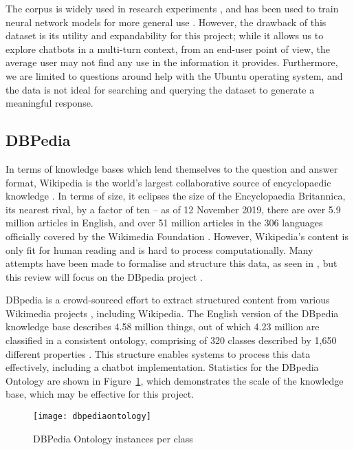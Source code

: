 The corpus is widely used in research experiments \cite{kadlec2015improved}, and has been used to train neural network models for more general use \cite{lowe2017training}. However, the drawback of this dataset is its utility and expandability for this project; while it allows us to explore chatbots in a multi-turn context, from an end-user point of view, the average user may not find any use in the information it provides. Furthermore, we are limited to questions around help with the Ubuntu operating system, and the data is not ideal for searching and querying the dataset to generate a meaningful response. 

\newpage
\subsection{DBPedia}
\label{sec:dbpedia}
In terms of knowledge bases which lend themselves to the question and answer format, Wikipedia is the world’s largest collaborative source of encyclopaedic knowledge \cite{volkel2006semantic}. In terms of size, it eclipses the size of the Encyclopaedia Britannica, its nearest rival, by a factor of ten \cite{medelyan2009mining} -- as of 12 November 2019, there are over 5.9 million articles in English, and over 51 million articles in the 306 languages officially covered by the Wikimedia Foundation \cite{wikimedia2019}. However, Wikipedia’s content is only fit for human reading \cite{volkel2006semantic} and is hard to process computationally. Many attempts have been made to formalise and structure this data, as seen in \cite{volkel2006semantic, medelyan2009mining, wu2007autonomously}, but this review will focus on the DBpedia project \cite{lehmann2015dbpedia}.

DBpedia is a crowd-sourced effort to extract structured content from various Wikimedia projects \cite{dbpedia2019about}, including Wikipedia. The English version of the DBpedia knowledge base describes 4.58 million things, out of which 4.23 million are classified in a consistent ontology, comprising of 320 classes described by 1,650 different properties \cite{dbpedia2019ontology}. This structure enables systems to process this data effectively, including a chatbot implementation. Statistics for the DBpedia Ontology are shown in Figure~\ref{fig:ontology}, which demonstrates the scale of the knowledge base, which may be effective for this project.

\begin{figure}[h]
	\begin{center}
		\texttt{[image: dbpediaontology]}
	\end{center}
	\caption{DBPedia Ontology instances per class \cite{dbpedia2019ontology}}
	\label{fig:ontology}
\end{figure}

